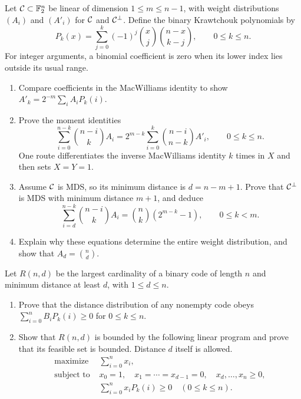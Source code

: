 \begin{exo}
\label{exo-polynomials-mds}
Let $\mathcal{C}\subset\mathbb{F}_2^n$ be linear of dimension $1\leq m\leq n-1$,
with weight distributions $(A_i)$ and $(A'_i)$ for $\mathcal{C}$ and $\mathcal{C}^\bot$.
Define the binary Krawtchouk polynomials by
\begin{equation}
\label{eq-defn-poly-krawtchouk}
 P_k(x)=\sum_{j=0}^k(-1)^j\binom{x}{j}\binom{n-x}{k-j},
 \qquad 0\leq k\leq n.
\end{equation}
For integer arguments, a binomial coefficient is zero when its lower
index lies outside its usual range.
\begin{enumerate}
\item Compare coefficients in the MacWilliams identity to show
$A'_k=2^{-m}\sum_iA_iP_k(i)$.
\item Prove the moment identities
\[
 \sum_{i=0}^{n-k}\binom{n-i}{k}A_i
   =2^{m-k}\sum_{i=0}^k\binom{n-i}{n-k}A'_i,
   \qquad 0\leq k\leq n.
\]
One route differentiates the inverse MacWilliams identity $k$ times in
$X$ and then sets $X=Y=1$.
\item Assume $\mathcal{C}$ is MDS, so its minimum distance is $d=n-m+1$.
Prove that $\mathcal{C}^\bot$ is MDS with minimum distance $m+1$, and deduce
\[
 \sum_{i=d}^{n-k}\binom{n-i}{k}A_i
    =\binom nk(2^{m-k}-1),\qquad 0\leq k<m.
\]
\item Explain why these equations determine the entire weight distribution,
and show that $A_d=\binom nd$.
\end{enumerate}
\end{exo}


\begin{exo}
\label{exo-terminal-linear-programming}
Let $R(n,d)$ be the largest cardinality of a binary code of length $n$
and minimum distance at least $d$, with $1\leq d\leq n$.
\begin{enumerate}
\item Prove that the distance distribution of any nonempty code obeys
$\sum_{i=0}^nB_iP_k(i)\geq0$ for $0\leq k\leq n$.
\item Show that $R(n,d)$ is bounded by the following linear program and
prove that its feasible set is bounded. Distance $d$ itself is allowed.
\[
 \begin{split}
 \text{maximize }&\sum_{i=0}^n x_i,\\
 \text{subject to }&x_0=1,\quad x_1=\cdots=x_{d-1}=0,\quad x_d,\ldots,x_n\geq0,\\
 &\sum_{i=0}^n x_iP_k(i)\geq0\quad(0\leq k\leq n).
 \end{split}
\]
\end{enumerate}
\end{exo}


